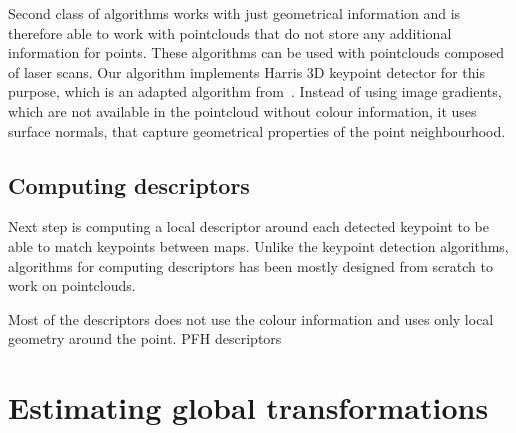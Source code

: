 Second class of algorithms works with just geometrical information and is therefore able to work with pointclouds that do not store any additional information for points. These algorithms can be used with pointclouds composed of laser scans. Our algorithm implements Harris 3D keypoint detector for this purpose, which is an adapted algorithm from~\cite{harris1988combined}. Instead of using image gradients, which are not available in the pointcloud without colour information, it uses surface normals, that capture geometrical properties of the point neighbourhood.

\subsection{Computing descriptors}

Next step is computing a local descriptor around each detected keypoint to be able to match keypoints between maps. Unlike the keypoint detection algorithms, algorithms for computing descriptors has been mostly designed from scratch to work on pointclouds.

Most of the descriptors does not use the colour information and uses only local geometry around the point. \gls{PFH} descriptors~\cite{rusu2008pfh}

\section{Estimating global transformations}
\label{sec:estimate-global}